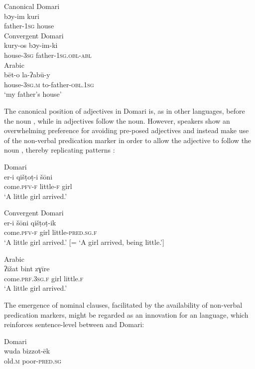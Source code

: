 \documentclass[output=paper]{langsci/langscibook}
\begin{document}
\ea
\ea
{{Canonical} Domari}\\
\gll bɔy-im kuri    \\
     father-\textsc{1sg} house\\ \label{kuri}
\ex
{Convergent Domari}\\
\gll kury-os bɔy-im-ki  \\
       house-\textsc{3sg} father-\textsc{1sg.obl-abl}\\ \label{boy}
\ex
{Arabic}\\
\gll bēt-o la-ʔabū-y  \\
       house-\textsc{3sg.m} to-father-\textsc{obl.1sg}\\
\glt   ‘my father’s house’ \label{bett}
\z
\z

The canonical position of adjectives in Domari is, as in other  languages, before the noun , while in  adjectives follow the noun. However, speakers show an overwhelming preference for avoiding pre-posed adjectives and instead make use of the non-verbal predication marker in order to allow the adjective to follow the noun , thereby replicating   patterns :

\ea\label{girls}
\ea
{ Domari}\\
\gll er-i qišṭoṭ-i šōni  \\
       come.\textsc{pfv-f} little-\textsc{f} girl\\
\glt   ‘A little girl arrived.’ \label{girla}

\ex
{Convergent Domari}\\
\gll   er-i šōni qišṭoṭ-ik  \\
       come.\textsc{pfv-f} girl little-\textsc{pred.sg.f}\\
\glt   ‘A little girl arrived.’ [= ‘A girl arrived, being little.’] \label{girlb}

\ex
{Arabic}\\
\gll ʔižat bint zɣīre  \\
       come.\textsc{prf.3sg.f} girl little.\textsc{f}\\
\glt   ‘A little girl arrived.’ \label{girlc}
\z
\z

The emergence of nominal clauses, facilitated by the availability of non-verbal predication markers, might be regarded as an innovation for an  language, which reinforces sentence-level  between  and Domari:

\ea
\ea
{Domari}\\
\gll wuda bizzot-ēk  \\
     old.\textsc{m} poor-\textsc{pred.sg}\\
     
\end{document}

